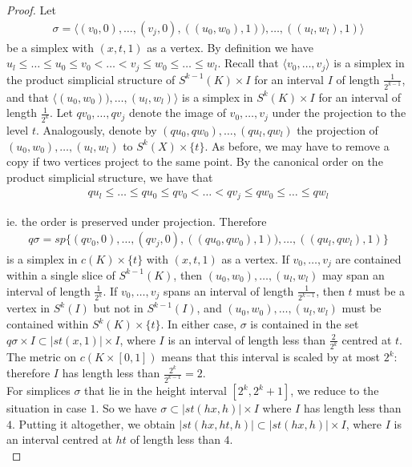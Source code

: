 \documentclass[a4paper,11pt]{article}
\theoremstyle{definition}
\theoremstyle{plain}
\theoremstyle{remark}
\begin{document}
\begin{proof}
Let 
 \begin{align*}
\sigma = \langle (v_0,0),\dots,(v_{j},0), ((u_0,w_0),1)), \dots, ((u_l,w_l),1) \rangle
\end{align*}
be a simplex with $(x,t,1)$ as a vertex. By definition we have $u_{l}\leq \dots \leq u_{0} \leq v_{0} <\dots< v_{j} \leq w_{0}\leq \dots \leq w_{l}$. Recall that  $\langle v_0,\dots,v_{j}\rangle$ is a simplex in the product simplicial structure of $S^{k-1}(K) \times I$ for an interval $I$ of length $\frac{1}{2^{k-1}}$, and that $ \langle (u_0,w_0)), \dots, (u_l,w_l)\rangle$ is a simplex in $S^{k}(K) \times I$ for an interval of length $\frac{1}{2^k}$. Let $qv_{0},\dots,qv_{j}$ denote the image of $v_0,\dots,v_{j}$ under the projection to the level $t$. Analogously, denote by  $(qu_0,qw_0), \dots, (qu_l,qw_l)$ the projection of $(u_0,w_0), \dots, (u_l,w_l)$ to $S^{k}(X) \times \{t\}$. As before, we may have to remove a copy if two vertices project to the same point. By the canonical order on the product simplicial structure, we have that 
 \begin{align*}
qu_{l}\leq \dots \leq qu_{0} \leq qv_{0} <\dots< qv_{j} \leq qw_{0}\leq \dots \leq qw_{l}
\end{align*}

ie. the order is preserved under projection. Therefore
\begin{align*}
q\sigma = sp\{(qv_0,0),\dots,(qv_{j},0), ((qu_0,qw_0),1)), \dots, ((qu_l,qw_l),1)\}
\end{align*} 
 is a simplex in $c(K)\times \{t\}$ with $(x,t,1)$ as a vertex. If $v_{0},\dots,v_{j}$ are  contained within a single slice of $S^{k-1}(K)$, then $(u_0,w_0), \dots, (u_l,w_l)$ may span an interval of length $\frac{1}{2^{k}}$. If  $v_{0},\dots,v_{j}$ spans an interval of length $\frac{1}{2^{k-1}}$, then $t$ must be a vertex in $S^{k}(I)$ but not in $S^{k-1}(I)$, and $(u_0,w_0), \dots, (u_l,w_l)$ must be contained within $S^{k}(K) \times \{t\}$. In either case, $\sigma$ is contained in the set $q\sigma \times I\subset |st(x,1)| \times I$, where $I$ is an interval of length less than $\frac{2}{2^{k}}$ centred at $t$. The metric on $c(K\times [0,1])$ means that this interval is scaled by at most $2^{k}$: therefore $I$ has length less than $\frac{2^{k}}{2^{k-1}}=2$. \\

For simplices $\sigma$ that lie in the height interval $[2^{k},2^{k}+1]$, we reduce to the situation in case $1$. So we have $\sigma \subset |st(hx,h)| \times I$ where $I$ has length less than $4$. Putting it altogether, we obtain $|st(hx,ht,h)|\subset |st(hx,h)| \times I$, where $I$ is an interval centred at $ht$ of length less than $4$.  \\
 

\end{proof}
\end{document}
